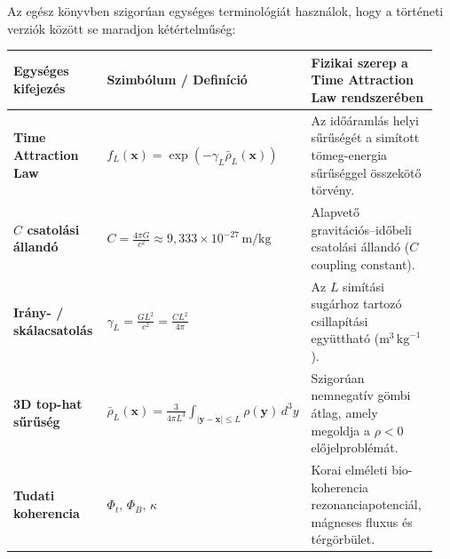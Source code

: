 \documentclass[10pt,a4paper]{article}
\begin{document}
\vspace{3mm}
\par
Az eg\'esz k\"onyvben szigor\'uan egys\'eges terminol\'ogi\'at haszn\'alok, hogy a t\"ort\'eneti verzi\'ok k\"oz\"ott se maradjon k\'et\'ertelm\H{u}s\'eg:
\begin{center}\vspace{-2pt}
{\footnotesize
\begin{tabular}{@{}>{\bfseries}p{0.28\linewidth}p{0.24\linewidth}p{0.43\linewidth}@{}}
\toprule
Egys\'eges kifejez\'es & Szimb\'olum / Defin\'ici\'o & Fizikai szerep a Time Attraction Law rendszer\'eben \\
\midrule
Time Attraction Law & $f_L(\mathbf{x}) = \exp(-\gamma_L \bar{\rho}_L(\mathbf{x}))$ & Az id\H{o}\'araml\'as helyi s\H{u}r\H{u}s\'eg\'et a sim\'itott t\"omeg-energia s\H{u}r\H{u}s\'eggel \"osszek\"ot\H{o} t\"orv\'eny. \\
$C$ csatol\'asi \'alland\'o & $C = \frac{4\pi G}{c^2} \approx 9{,}333\times 10^{-27}\,\text{m/kg}$ & Alapvet\H{o} gravit\'aci\'os--id\H{o}beli csatol\'asi \'alland\'o ($C$ coupling constant). \\
Ir\'any- / sk\'alacsatol\'as & $\gamma_L = \frac{G L^2}{c^2} = \frac{C L^2}{4\pi}$ & Az $L$ sim\'it\'asi sug\'arhoz tartoz\'o csillap\'it\'asi egy\"utthat\'o ($\text{m}^3\,\text{kg}^{-1}$). \\
3D top-hat s\H{u}r\H{u}s\'eg & $\bar{\rho}_L(\mathbf{x}) = \frac{3}{4\pi L^3}\int_{|\mathbf{y}-\mathbf{x}|\le L}\rho(\mathbf{y})\,d^3y$ & Szigor\'uan nemnegat\'iv g\"ombi \'atlag, amely megoldja a $\rho<0$ el\H{o}jelprobl\'em\'at. \\
Tudati koherencia & $\Phi_t,\,\Phi_B,\,\kappa$ & Korai elm\'eleti bio-koherencia rezonanciapotenci\'al, m\'agneses fluxus \'es t\'erg\"orb\"ulet. \\
\bottomrule
\end{tabular}}
\end{center}
\end{document}
